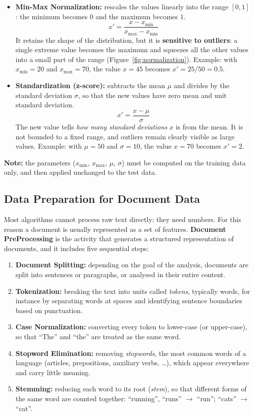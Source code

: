 \begin{itemize}
    \item \textbf{Min-Max Normalization:} rescales the values linearly into the range $[0,1]$: the minimum becomes $0$ and the maximum becomes $1$.
    \[
        x'=\frac{x-x_{\min}}{x_{\max}-x_{\min}}
    \]
    It retains the shape of the distribution, but it is \textbf{sensitive to outliers}: a single extreme value becomes the maximum and squeezes all the other values into a small part of the range (Figure~\ref{fig:normalization}). Example: with $x_{\min}=20$ and $x_{\max}=70$, the value $x=45$ becomes $x'=25/50=0.5$.
    \item \textbf{Standardization (z-score):} subtracts the mean $\mu$ and divides by the standard deviation $\sigma$, so that the new values have zero mean and unit standard deviation.
    \[
        x'=\frac{x-\mu}{\sigma}
    \]
    The new value tells \emph{how many standard deviations} $x$ is from the mean. It is not bounded to a fixed range, and outliers remain clearly visible as large values. Example: with $\mu=50$ and $\sigma=10$, the value $x=70$ becomes $x'=2$.
\end{itemize}


\noindent\textbf{Note:} the parameters ($x_{\min}$, $x_{\max}$, $\mu$, $\sigma$) must be computed on the training data only, and then applied unchanged to the test data.

\subsection{Data Preparation for Document Data}
Most algorithms cannot process raw text directly: they need numbers. For this reason a document is usually represented as a set of features. \textbf{Document PreProcessing} is the activity that generates a structured representation of documents, and it includes five sequential steps:
\begin{enumerate}
    \item \textbf{Document Splitting:} depending on the goal of the analysis, documents are split into sentences or paragraphs, or analysed in their entire content.
    \item \textbf{Tokenization:} breaking the text into units called \emph{tokens}, typically words, for instance by separating words at spaces and identifying sentence boundaries based on punctuation.
    \item \textbf{Case Normalization:} converting every token to lower-case (or upper-case), so that ``The'' and ``the'' are treated as the same word.
    \item \textbf{Stopword Elimination:} removing \emph{stopwords}, the most common words of a language (articles, prepositions, auxiliary verbs, \dots), which appear everywhere and carry little meaning.
    \item \textbf{Stemming:} reducing each word to its root (\emph{stem}), so that different forms of the same word are counted together: ``running'', ``runs'' $\rightarrow$ ``run''; ``cats'' $\rightarrow$ ``cat''.
\end{enumerate}

